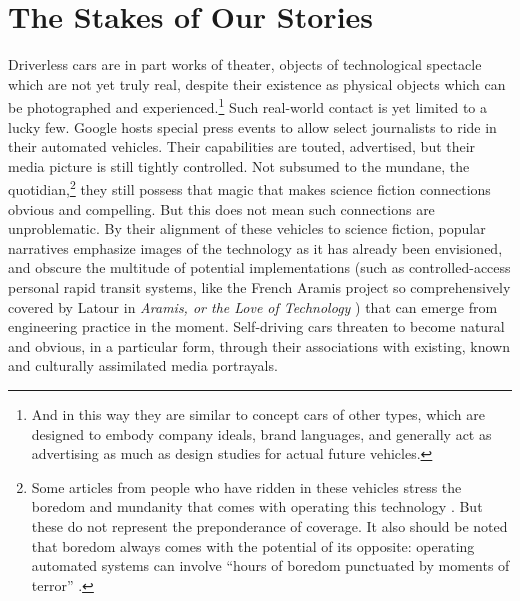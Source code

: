 \section{The Stakes of Our Stories}

Driverless cars
are in part works of theater, objects of technological spectacle which
are not yet truly real, despite their existence as physical objects
which can be photographed and experienced.\footnote{And in this way
  they are similar to concept cars of other types, which are designed
  to embody company ideals, brand languages, and generally act as
  advertising as much as design studies for actual future vehicles.}
Such real-world contact is 
yet limited to a lucky few. Google hosts special press events to allow
select journalists
to ride in their automated vehicles. Their capabilities are touted,
advertised, but their media picture is still tightly controlled. Not subsumed
to the mundane, the quotidian,\footnote{Some articles from people
  who have ridden in these vehicles stress the
  boredom and mundanity that comes with operating this
  technology \cite{rode500}. But these do not represent the
  preponderance of coverage. It also should be noted that boredom
  always comes with the potential of its opposite: operating automated
systems can involve ``hours of boredom
punctuated by moments of terror'' \cite[p. 339]{sheridan}.} they still
possess that magic that 
makes science fiction connections obvious and compelling. But this
does not mean such connections are unproblematic. By
their alignment of these vehicles to science fiction, popular
narratives emphasize images of the technology as it has already been
envisioned, and obscure the multitude of potential implementations
(such as controlled-access personal rapid transit systems, 
like the French Aramis
project so comprehensively covered by Latour in \emph{Aramis, or the
  Love of Technology} \cite{Aramis})
that can emerge from engineering practice in the moment. Self-driving
cars threaten to become natural and obvious, in a particular form,
through their associations with existing, known and culturally
assimilated media portrayals. 



